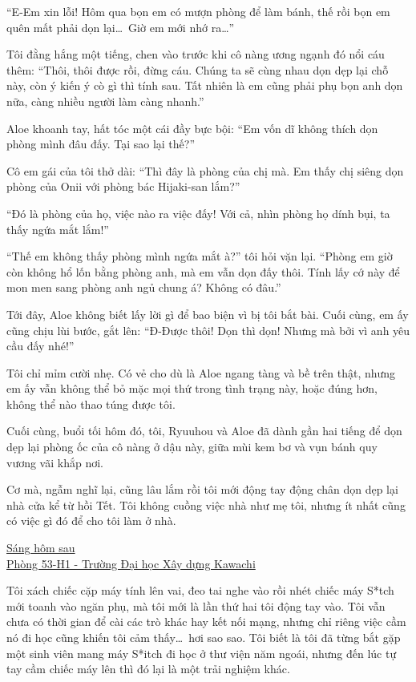 \documentclass[../main.tex]{subfiles}
\begin{document}
``E-Em xin lỗi! Hôm qua bọn em có mượn phòng để làm bánh, thế rồi bọn em quên mất phải dọn lại\dots\ Giờ em mới nhớ ra\dots''

Tôi đằng hắng một tiếng, chen vào trước khi cô nàng ương ngạnh đó nổi cáu thêm: ``Thôi, thôi được rồi, đừng cáu. Chúng ta sẽ cùng nhau dọn dẹp lại chỗ này, còn ý kiến ý cò gì thì tính sau. Tất nhiên là em cũng phải phụ bọn anh dọn nữa, càng nhiều người làm càng nhanh.''

Aloe khoanh tay, hất tóc một cái đầy bực bội: ``Em vốn dĩ không thích dọn phòng mình đâu đấy. Tại sao lại thế?''

Cô em gái của tôi thở dài: ``Thì đây là phòng của chị mà. Em thấy chị siêng dọn phòng của Onii với phòng bác Hijaki-san lắm?''

``Đó là phòng của họ, việc nào ra việc đấy! Với cả, nhìn phòng họ dính bụi, ta thấy ngứa mắt lắm!''

``Thế em không thấy phòng mình ngứa mắt à?'' tôi hỏi vặn lại. ``Phòng em giờ còn không hổ lốn bằng phòng anh, mà em vẫn dọn đấy thôi. Tính lấy cớ này để mon men sang phòng anh ngủ chung á? Không có đâu.''

Tới đây, Aloe không biết lấy lời gì để bao biện vì bị tôi bắt bài. Cuối cùng, em ấy cũng chịu lùi bước, gắt lên: ``Đ-Được thôi! Dọn thì dọn! Nhưng mà bởi vì anh yêu cầu đấy nhé!''

Tôi chỉ mỉm cười nhẹ. Có vẻ cho dù là Aloe ngang tàng và bề trên thật, nhưng em ấy vẫn không thể bỏ mặc mọi thứ trong tình trạng này, hoặc đúng hơn, không thể nào thao túng được tôi.

Cuối cùng, buổi tối hôm đó, tôi, Ryuuhou và Aloe đã dành gần hai tiếng để dọn dẹp lại phòng ốc của cô nàng ở dậu này, giữa mùi kem bơ và vụn bánh quy vương vãi khắp nơi.

Cơ mà, ngẫm nghĩ lại, cũng lâu lắm rồi tôi mới động tay động chân dọn dẹp lại nhà cửa kể từ hồi Tết. Tôi không cuồng việc nhà như mẹ tôi, nhưng ít nhất cũng có việc gì đó để cho tôi làm ở nhà.

\begin{center}
    \uline{Sáng hôm sau\\Phòng 53-H1 - Trường Đại học Xây dựng Kawachi}
\end{center}

Tôi xách chiếc cặp máy tính lên vai, đeo tai nghe vào rồi nhét chiếc máy S*tch mới toanh vào ngăn phụ, mà tôi mới là lần thứ hai tôi động tay vào. Tôi vẫn chưa có thời gian để cài các trò khác hay kết nối mạng, nhưng chỉ riêng việc cầm nó đi học cũng khiến tôi cảm thấy\dots\ hơi sao sao. Tôi biết là tôi đã từng bắt gặp một sinh viên mang máy S*itch đi học ở thư viện năm ngoái, nhưng đến lúc tự tay cầm chiếc máy lên thì đó lại là một trải nghiệm khác.
\end{document}
